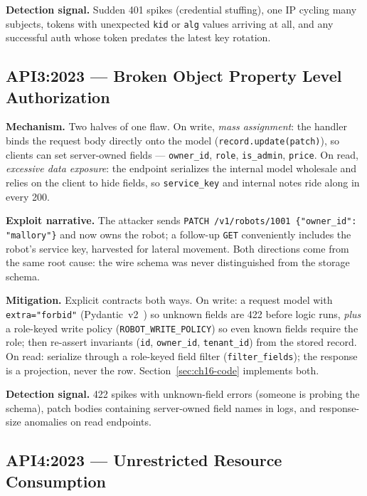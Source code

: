 \textbf{Detection signal.} Sudden 401 spikes (credential stuffing), one IP
cycling many subjects, tokens with unexpected \texttt{kid} or \texttt{alg}
values arriving at all, and any successful auth whose token predates the
latest key rotation.

\subsection{API3:2023 --- Broken Object Property Level Authorization}
\label{sec:ch16-api3}

\textbf{Mechanism.} Two halves of one flaw. On write, \emph{mass
assignment}: the handler binds the request body directly onto the model
(\texttt{record.update(patch)}), so clients can set server-owned fields ---
\texttt{owner\_id}, \texttt{role}, \texttt{is\_admin}, \texttt{price}. On
read, \emph{excessive data exposure}: the endpoint serializes the internal
model wholesale and relies on the client to hide fields, so
\texttt{service\_key} and internal notes ride along in every 200.

\textbf{Exploit narrative.} The attacker sends
\texttt{PATCH /v1/robots/1001 \{"owner\_id": "mallory"\}} and now owns the
robot; a follow-up \texttt{GET} conveniently includes the robot's service
key, harvested for lateral movement. Both directions come from the same
root cause: the wire schema was never distinguished from the storage schema.

\textbf{Mitigation.} Explicit contracts both ways. On write: a request model
with \texttt{extra="forbid"} (Pydantic~v2~\cite{pydanticdocs}) so unknown
fields are 422 before logic runs, \emph{plus} a role-keyed write policy
(\texttt{ROBOT\_WRITE\_POLICY}) so even known fields require the role; then
re-assert invariants (\texttt{id}, \texttt{owner\_id}, \texttt{tenant\_id})
from the stored record. On read: serialize through a role-keyed field
filter (\texttt{filter\_fields}); the response is a projection, never the
row. Section~\ref{sec:ch16-code} implements both.

\textbf{Detection signal.} 422 spikes with unknown-field errors (someone is
probing the schema), patch bodies containing server-owned field names in
logs, and response-size anomalies on read endpoints.

\subsection{API4:2023 --- Unrestricted Resource Consumption}
\label{sec:ch16-api4}

